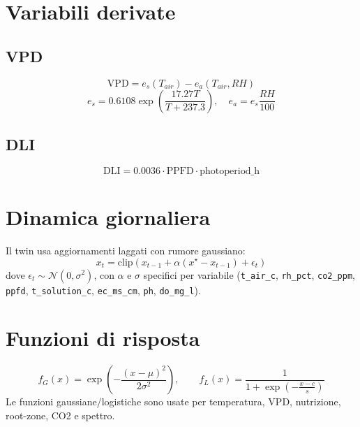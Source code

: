 ﻿\documentclass[11pt,a4paper]{report}
\begin{document}
\section{Variabili derivate}
\subsection*{VPD}
\begin{equation}
\mathrm{VPD} = e_s(T_{air}) - e_a(T_{air}, RH)
\end{equation}
\begin{equation}
e_s = 0.6108\exp\left(\frac{17.27T}{T+237.3}\right), \quad e_a = e_s\frac{RH}{100}
\end{equation}

\subsection*{DLI}
\begin{equation}
\mathrm{DLI} = 0.0036 \cdot \mathrm{PPFD} \cdot \mathrm{photoperiod\_h}
\end{equation}

\section{Dinamica giornaliera}
Il twin usa aggiornamenti laggati con rumore gaussiano:
\begin{equation}
x_t = \mathrm{clip}(x_{t-1} + \alpha(x^\star - x_{t-1}) + \epsilon_t)
\end{equation}
dove \(\epsilon_t \sim \mathcal{N}(0,\sigma^2)\), con \(\alpha\) e \(\sigma\) specifici per variabile (\texttt{t\_air\_c}, \texttt{rh\_pct}, \texttt{co2\_ppm}, \texttt{ppfd}, \texttt{t\_solution\_c}, \texttt{ec\_ms\_cm}, \texttt{ph}, \texttt{do\_mg\_l}).

\section{Funzioni di risposta}
\begin{equation}
f_G(x)=\exp\left(-\frac{(x-\mu)^2}{2\sigma^2}\right), \qquad
f_L(x)=\frac{1}{1+\exp\left(-\frac{x-c}{s}\right)}
\end{equation}
Le funzioni gaussiane/logistiche sono usate per temperatura, VPD, nutrizione, root-zone, CO2 e spettro.
\end{document}
